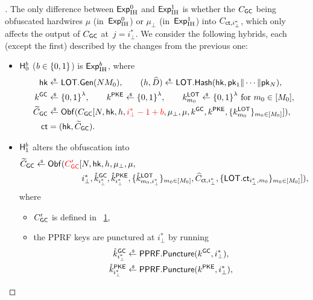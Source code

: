 \begin{figure}

\label{fig:circuit-create-gc-proof}
\end{figure}

\begin{proof}[]
The only difference between ${\smash{\mathsf{Exp}}_{\textup{IH}}^{0}}$ and ${\smash{\mathsf{Exp}}_{\textup{IH}}^{1}}$ is whether the $C_{\smash{\mathsf{GC}}}$ being obfuscated hardwires $\mu$ (in~${\smash{\mathsf{Exp}}_{\textup{IH}}^{0}}$) or $\mu_\bot$ (in~${\smash{\mathsf{Exp}}_{\textup{IH}}^{1}}$) into $C_{\ct,i_\bot^\ast}$, which only affects the output of $C_{\smash{\mathsf{GC}}}$ at~${j=i_\bot^\ast}$.
We consider the following hybrids, each (except the first) described by the changes from the previous one:
\begin{itemize}
\item ${\smash{\mathsf{H}}}_0^b$ (${b\in{\{0,1\}}}$) is ${\smash{\mathsf{Exp}}_{\textup{IH}}^{b}}$, where
\begin{align*}
\hk&{}\draws\LOT.\Gen(NM_0),\qquad
(h,\widehat{D})\draws\LOT.\Hash(\hk,\pk_1\concat\cdots\concat\pk_N),\\
k^\GC&{}\draws\bit^\lambda,\qquad
k^\PKE\draws\bit^\lambda,\qquad
k^\LOT_{m_0}\draws\bit^\lambda\textup{ for }m_0\in[M_0],\\
\widetilde{C}_\GC&{}\draws\Obf(C_\GC[
N,\hk,h,{\color{red}i_\bot^\ast-1+b},\mu_\bot,\mu,k^\GC,k^\PKE,\{k^\LOT_{m_0}\}_{m_0\in[M_0]}
]),\\
\ct&{}=(\hk,\widetilde{C}_\GC).
\end{align*}
\item ${\smash{\mathsf{H}}}_1^b$ alters the obfuscation into
\begin{align*}
\WideNarrow{}{\hspace*{-1.5em}}
\widetilde{C}_\GC\draws\Obf({\color{red}C_\GC'}[
{}&
N,\hk,h,\mu_\bot,\mu,
\\ &
i_\bot^\ast,
\mathring{k}^\GC_{i_\bot^\ast},
\mathring{k}^\PKE_{i_\bot^\ast},
\{\mathring{k}^\LOT_{m_0,i_\bot^\ast}\}_{m_0\in[M_0]},
\widehat{C}_{\ct,i_\bot^\ast},
\{\LOT.\ct_{i_\bot^\ast,m_0}\}_{m_0\in[M_0]}
]),
\end{align*}
where
\begin{itemize}
\item $C_{\smash{\mathsf{GC}}}'$ is defined in \Figure~\ref{fig:circuit-create-gc-proof},
\item the PPRF keys are punctured at $i_\bot^\ast$ by running
\begin{align*}
\mathring{k}^\GC_{i_\bot^\ast}&{}\draws\PPRF.\Puncture(k^\GC,i_\bot^\ast),\\
\mathring{k}^\PKE_{i_\bot^\ast}&{}\draws\PPRF.\Puncture(k^\PKE,i_\bot^\ast),\\

\end{align*}
\end{itemize}
\end{itemize}
\end{proof}
